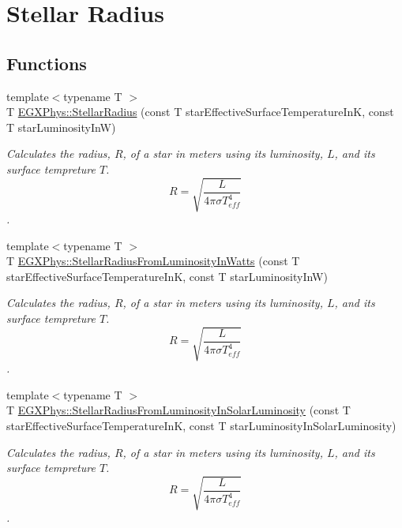 \hypertarget{group___e_g_x_phys-_stellar_radius}{}\section{Stellar Radius}
\label{group___e_g_x_phys-_stellar_radius}
\subsection*{Functions}
\begin{DoxyCompactItemize}
\item 
{\footnotesize template$<$typename T $>$ }\\T \mbox{\hyperlink{group___e_g_x_phys-_stellar_radius_ga612cd22c37341a1864cd2fc5c858e18e}{E\+G\+X\+Phys\+::\+Stellar\+Radius}} (const T star\+Effective\+Surface\+Temperature\+InK, const T star\+Luminosity\+InW)
\begin{DoxyCompactList}\small\item\em Calculates the radius, $R$, of a star in meters using its luminosity, $L$, and its surface tempreture $T$. \[R=\sqrt{\dfrac{L}{4\pi \sigma T_{eff}^4}}\]. \end{DoxyCompactList}\item 
{\footnotesize template$<$typename T $>$ }\\T \mbox{\hyperlink{group___e_g_x_phys-_stellar_radius_ga59f0d5d89a857d30bff4c93713ee5bd9}{E\+G\+X\+Phys\+::\+Stellar\+Radius\+From\+Luminosity\+In\+Watts}} (const T star\+Effective\+Surface\+Temperature\+InK, const T star\+Luminosity\+InW)
\begin{DoxyCompactList}\small\item\em Calculates the radius, $R$, of a star in meters using its luminosity, $L$, and its surface tempreture $T$. \[R=\sqrt{\dfrac{L}{4\pi \sigma T_{eff}^4}}\]. \end{DoxyCompactList}\item 
{\footnotesize template$<$typename T $>$ }\\T \mbox{\hyperlink{group___e_g_x_phys-_stellar_radius_ga49f0848777ba12cdfc78d112d82036ce}{E\+G\+X\+Phys\+::\+Stellar\+Radius\+From\+Luminosity\+In\+Solar\+Luminosity}} (const T star\+Effective\+Surface\+Temperature\+InK, const T star\+Luminosity\+In\+Solar\+Luminosity)
\begin{DoxyCompactList}\small\item\em Calculates the radius, $R$, of a star in meters using its luminosity, $L$, and its surface tempreture $T$. \[R=\sqrt{\dfrac{L}{4\pi \sigma T_{eff}^4}}\]. \end{DoxyCompactList}\item 

\end{DoxyCompactItemize}
